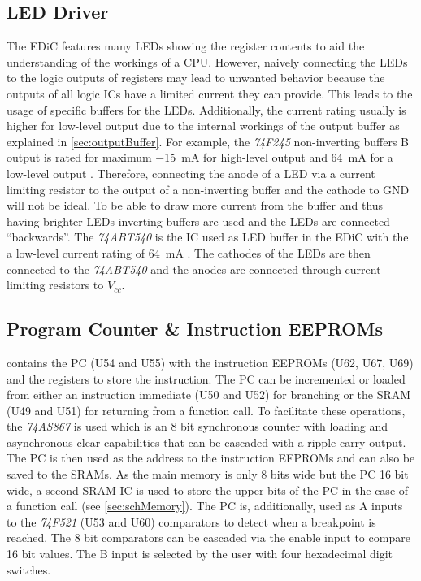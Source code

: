 \subsection{LED Driver}\label{sec:ledBuffer}
The \gls{EDiC} features many \glspl{LED} showing the register contents to aid the understanding of the workings of a \gls{CPU}.
However, naively connecting the \glspl{LED} to the logic outputs of registers may lead to unwanted behavior because the outputs of all logic \glspl{IC} have a limited current they can provide.
This leads to the usage of specific buffers for the \glspl{LED}.
Additionally, the current rating usually is higher for low-level output due to the internal workings of the output buffer as explained in \cref{sec:outputBuffer}.
For example, the \emph{74F245} non-inverting buffers B output is rated for maximum \qty{-15}{\milli\ampere} for high-level output and \qty{64}{\milli\ampere} for a low-level output \cite{74f245}.
Therefore, connecting the anode of a \gls{LED} via a current limiting resistor to the output of a non-inverting buffer and the cathode to GND will not be ideal.
To be able to draw more current from the buffer and thus having brighter \glspl{LED} inverting buffers are used and the \glspl{LED} are connected ``backwards''.
The \emph{74ABT540} is the \gls{IC} used as \gls{LED} buffer in the \gls{EDiC} with the a low-level current rating of \qty{64}{\milli\ampere} \cite{74abt540}.
The cathodes of the \glspl{LED} are then connected to the \emph{74ABT540} and the anodes are connected through current limiting resistors to $V_{cc}$.

\subsection{Program Counter \& Instruction \glspl{EEPROM}}
 contains the \gls{PC} (U54 and U55) with the instruction \glspl{EEPROM} (U62, U67, U69) and the registers to store the instruction.
The \gls{PC} can be incremented or loaded from either an instruction immediate (U50 and U52) for branching or the \gls{SRAM} (U49 and U51) for returning from a function call.
To facilitate these operations, the \emph{74AS867} is used which is an 8 bit synchronous counter with loading and asynchronous clear capabilities that can be cascaded with a ripple carry output.
The \gls{PC} is then used as the address to the instruction \glspl{EEPROM} and can also be saved to the \glspl{SRAM}.
As the main memory is only 8 bits wide but the \gls{PC} 16 bit wide, a second \gls{SRAM} \gls{IC} is used to store the upper bits of the \gls{PC} in the case of a function call (see \cref{sec:schMemory}).
The \gls{PC} is, additionally, used as A inputs to the \emph{74F521} (U53 and U60) comparators to detect when a breakpoint is reached.
The 8 bit comparators can be cascaded via the enable input to compare 16 bit values.
The B input is selected by the user with four hexadecimal digit switches.

